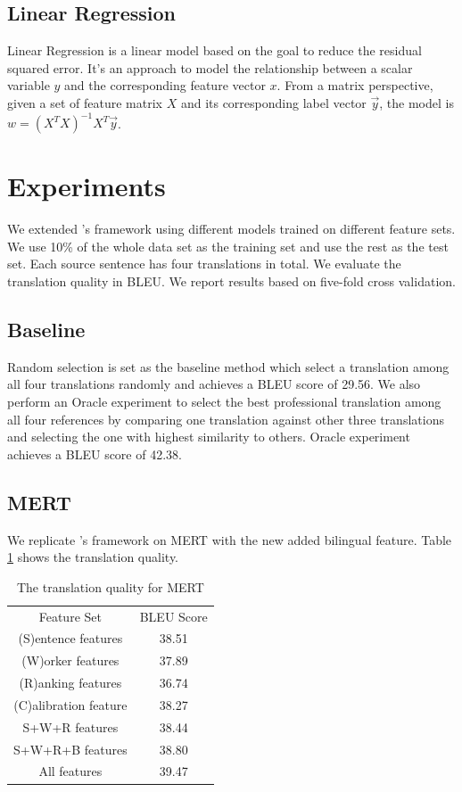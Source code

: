 \subsection{Linear Regression}
Linear Regression is a linear model based on the goal to reduce the residual squared error. It's an approach to model the relationship between a scalar variable $y$ and the corresponding feature vector $x$. From a matrix perspective, given a set of feature matrix $X$ and its corresponding label vector $\vec{y}$, the model is $w = (X^{T}X)^{-1}X^{T}\vec{y}$. 

\section{Experiments}

We extended \cite{zaidan-callisonburch:2011:ACL-HLT2011a}'s framework using different models trained on different feature sets. We use 10\% of the whole data set as the training set and use the rest as the test set.  Each source sentence has four translations in total. We evaluate the translation quality in BLEU. We report results based on five-fold cross validation.
\subsection{Baseline}
Random selection is set as the baseline method which select a translation among all four translations randomly and achieves a BLEU score of 29.56. We also perform an Oracle experiment to select the best professional translation  among all four references by comparing one translation against other three translations and selecting the one with highest similarity to others. Oracle experiment achieves a BLEU score of 42.38.
\subsection{MERT}
We replicate \cite{zaidan-callisonburch:2011:ACL-HLT2011a}'s framework on MERT with the new added bilingual feature. Table \ref{mertbleu} shows the translation quality. 
\begin{table}[h]
\center
\begin{tabular}{c|c}
\hline
Feature Set           & BLEU Score \\ \hhline{==}
(S)entence features   & 38.51      \\ \hline
(W)orker features     & 37.89      \\ \hline
(R)anking features    & 36.74      \\ \hline
(C)alibration feature & 38.27      \\ \hline
S+W+R features        & 38.44      \\ \hline
S+W+R+B features      & 38.80      \\ \hline
All features          & 39.47      \\ \hline
\end{tabular}
\caption{The translation quality for MERT}
\label{mertbleu}
\end{table}
